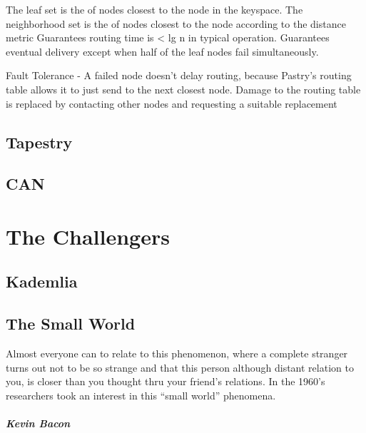 \documentclass[10pt,letterpaper]{report}
\begin{document}
The leaf set is the  of nodes closest to the node in the keyspace.  The neighborhood set is the  of nodes closest to the node according to the distance metric
Guarantees  routing time is  < lg n in typical operation.  Guarantees eventual delivery except when half of the leaf nodes fail simultaneously.


Fault Tolerance -  A failed node doesn't delay  routing, because Pastry's routing table allows it to just send to the next closest node.  Damage to the routing table is replaced by contacting other nodes and requesting a suitable replacement


\section{Tapestry}

\section{CAN}




\chapter{The Challengers}

\section{Kademlia}

\section{The Small World}

Almost everyone can to relate to this phenomenon, where a complete stranger turns out not to be so strange and that this person although distant relation to you, is closer than you thought thru your friend's relations.  In the 1960's researchers took an interest in this ``small world'' phenomena.	


\paragraph{Kevin Bacon}
\end{document}
